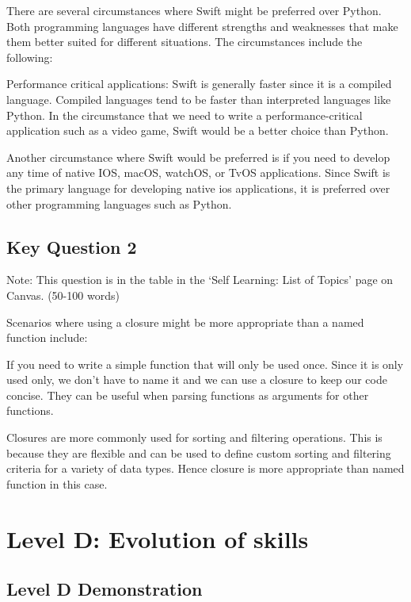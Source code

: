 \documentclass[a4paper, 11pt]{report}
\begin{document}
There are several circumstances where Swift might be preferred over Python. Both programming languages have different strengths and weaknesses that make them better suited for different situations. The circumstances include the following:

Performance critical applications: Swift is generally faster since it is a compiled language. Compiled languages tend to be faster than interpreted languages like Python. In the circumstance that we need to write a performance-critical application such as a video game, Swift would be a better choice than Python.

Another circumstance where Swift would be preferred is if you need to develop any time of native IOS, macOS, watchOS, or TvOS applications. Since Swift is the primary language for developing native ios applications, it is preferred over other programming languages such as Python.


\subsection{Key Question 2}
Note: This question is in the table in the ‘Self Learning: List of Topics’ page on Canvas. (50-100 words)

Scenarios where using a closure might be more appropriate than a named function include:

If you need to write a simple function that will only be used once. Since it is only used only, we don’t have to name it and we can use a closure to keep our code concise. They can be useful when parsing functions as arguments for other functions.

Closures are more commonly used for sorting and filtering operations. This is because they are flexible and can be used to define custom sorting and filtering criteria for a variety of data types. Hence closure is more appropriate than named function in this case.




\newpage
\section{Level D: Evolution of skills}
\vspace{5mm}
\subsection{Level D Demonstration}
\end{document}

